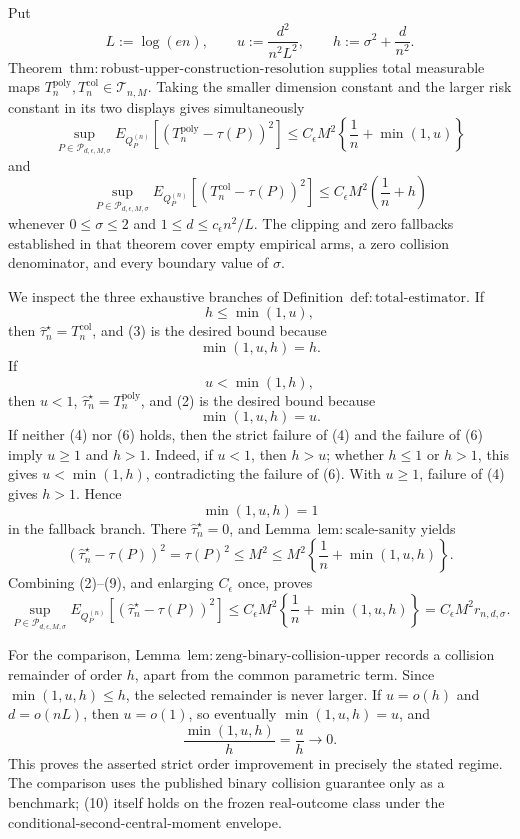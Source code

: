 Put
\[
 L:=\log(en),\qquad
 u:=\frac{d^2}{n^2L^2},\qquad
 h:=\sigma^2+\frac d{n^2}.
\tag{1}
\]
Theorem~\(\mathrm{thm:robust\text{-}upper\text{-}construction\text{-}resolution}\) supplies total measurable maps \(T_n^{\mathrm{poly}},T_n^{\mathrm{col}}\in\mathcal T_{n,M}\).  Taking the smaller dimension constant and the larger risk constant in its two displays gives simultaneously
\[
 \sup_{P\in\mathcal P_{d,\epsilon,M,\sigma}}
 E_{Q_P^{(n)}}[(T_n^{\mathrm{poly}}-\tau(P))^2]
 \le C_{\epsilon}M^2\left\{\frac1n+\min(1,u)\right\}
\tag{2}
\]
and
\[
 \sup_{P\in\mathcal P_{d,\epsilon,M,\sigma}}
 E_{Q_P^{(n)}}[(T_n^{\mathrm{col}}-\tau(P))^2]
 \le C_{\epsilon}M^2\left(\frac1n+h\right)
\tag{3}
\]
whenever \(0\le\sigma\le2\) and \(1\le d\le c_\epsilon n^2/L\).  The clipping and zero fallbacks established in that theorem cover empty empirical arms, a zero collision denominator, and every boundary value of \(\sigma\).

We inspect the three exhaustive branches of Definition~\(\mathrm{def:total\text{-}estimator}\).  If
\[
 h\le\min(1,u),
\tag{4}
\]
then \(\widehat\tau_n^{\star}=T_n^{\mathrm{col}}\), and (3) is the desired bound because
\[
 \min(1,u,h)=h.
\tag{5}
\]
If
\[
 u<\min(1,h),
\tag{6}
\]
then \(u<1\), \(\widehat\tau_n^{\star}=T_n^{\mathrm{poly}}\), and (2) is the desired bound because
\[
 \min(1,u,h)=u.
\tag{7}
\]
If neither (4) nor (6) holds, then the strict failure of (4) and the failure of (6) imply \(u\ge1\) and \(h>1\).  Indeed, if \(u<1\), then \(h>u\); whether \(h\le1\) or \(h>1\), this gives \(u<\min(1,h)\), contradicting the failure of (6).  With \(u\ge1\), failure of (4) gives \(h>1\).  Hence
\[
 \min(1,u,h)=1
\tag{8}
\]
in the fallback branch.  There \(\widehat\tau_n^{\star}=0\), and Lemma~\(\mathrm{lem:scale\text{-}sanity}\) yields
\[
 (\widehat\tau_n^{\star}-\tau(P))^2=\tau(P)^2
 \le M^2
 \le M^2\left\{\frac1n+\min(1,u,h)\right\}.
\tag{9}
\]
Combining (2)--(9), and enlarging \(C_{\epsilon}\) once, proves
\[
 \sup_{P\in\mathcal P_{d,\epsilon,M,\sigma}}
 E_{Q_P^{(n)}}[(\widehat\tau_n^{\star}-\tau(P))^2]
 \le C_{\epsilon}M^2
 \left\{\frac1n+\min(1,u,h)\right\}
 =C_{\epsilon}M^2r_{n,d,\sigma}.
\tag{10}
\]

For the comparison, Lemma~\(\mathrm{lem:zeng\text{-}binary\text{-}collision\text{-}upper}\) records a collision remainder of order \(h\), apart from the common parametric term.  Since \(\min(1,u,h)\le h\), the selected remainder is never larger.  If \(u=o(h)\) and \(d=o(nL)\), then \(u=o(1)\), so eventually \(\min(1,u,h)=u\), and
\[
 \frac{\min(1,u,h)}{h}=\frac uh\longrightarrow0.
\tag{11}
\]
This proves the asserted strict order improvement in precisely the stated regime.  The comparison uses the published binary collision guarantee only as a benchmark; (10) itself holds on the frozen real-outcome class under the conditional-second-central-moment envelope.
